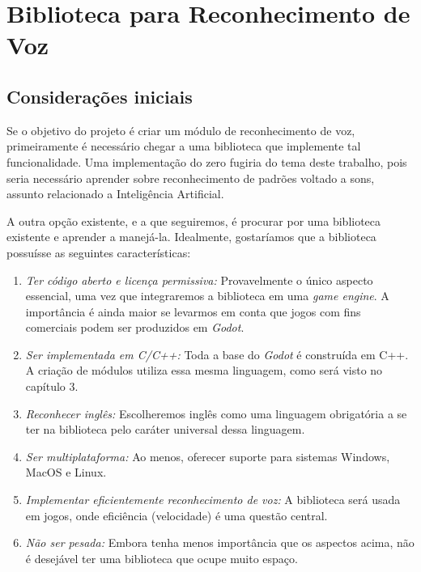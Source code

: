 \chapter{Biblioteca para Reconhecimento de Voz}
\label{cap:speech-libs}


\section{Considerações iniciais}

Se o objetivo do projeto é criar um módulo de reconhecimento de voz, primeiramente é
necessário chegar a uma biblioteca que implemente tal funcionalidade. Uma
implementação do zero fugiria do tema deste trabalho, pois seria necessário aprender
sobre reconhecimento de padrões voltado a sons, assunto relacionado a Inteligência
Artificial.

A outra opção existente, e a que seguiremos, é procurar por uma biblioteca existente
e aprender a manejá-la. Idealmente, gostaríamos que a biblioteca possuísse as
seguintes características:

\begin{enumerate}
\item \emph{Ter código aberto e licença permissiva:} Provavelmente o único aspecto
essencial, uma vez que integraremos a biblioteca em uma \emph{game engine}. A
importância é ainda maior se levarmos em conta que jogos com fins comerciais podem
ser produzidos em \emph{Godot}.

\item \emph{Ser implementada em C/C++:} Toda a base do \emph{Godot} é construída em
C++. A criação de módulos utiliza essa mesma linguagem, como será visto no capítulo
3.

\item \emph{Reconhecer inglês:} Escolheremos inglês como uma linguagem obrigatória
a se ter na biblioteca pelo caráter universal dessa linguagem.

\item \emph{Ser multiplataforma:} Ao menos, oferecer suporte para sistemas Windows,
MacOS e Linux.

\item \emph{Implementar eficientemente reconhecimento de voz:} A biblioteca será
usada em jogos, onde eficiência (velocidade) é uma questão central.

\item \emph{Não ser pesada:} Embora tenha menos importância que os aspectos acima,
não é desejável ter uma biblioteca que ocupe muito espaço.
\end{enumerate}

